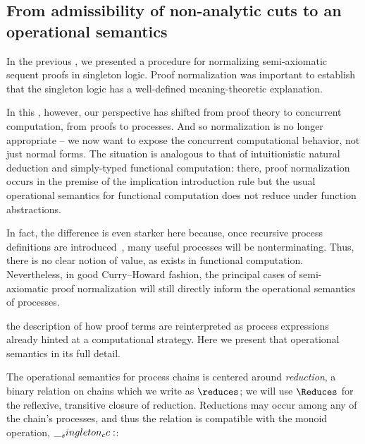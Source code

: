 \subsection{From admissibility of non-analytic cuts to an operational semantics}\label{sec:process-chains:reductions}

In the previous , we presented a procedure for normalizing semi-axio\-matic sequent proofs in singleton logic.
Proof normalization was important to establish that the singleton logic has a well-defined meaning-theoretic explanation.

In this , however, our perspective has shifted from proof theory to concurrent computation, from proofs to processes.
And so normalization is no longer appropriate -- we now want to expose the concurrent computational behavior, not just normal forms.
The situation is analogous to that of intuitionistic natural deduction and simply-typed functional computation: there, proof normalization occurs in the premise of the implication introduction rule but the usual operational semantics for functional computation does not reduce under function abstractions.

In fact, the difference is even starker here because, once recursive process definitions are introduced~, many useful processes will be nonterminating.
Thus, there is no clear notion of value, as exists in functional computation.
Nevertheless, in good Curry--Howard fashion, the principal cases of semi-axiomatic proof normalization will still directly inform the operational semantics of processes.

 the description of how proof terms are reinterpreted as process expressions already hinted at a computational strategy.
Here we present that operational semantics in its full detail.

The operational semantics for process chains is centered around \emph{reduction}, a binary relation on chains which we write as $\reduces$;
we will use $\Reduces$ for the reflexive, transitive closure of reduction.
Reductions may occur among any of the chain's processes, and thus the relation is compatible with the monoid operation, $\__singleton_cc:$:

